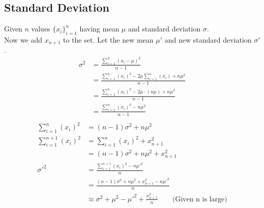 \documentclass[11pt]{article}
\begin{document}
\subsection*{Standard Deviation}
Given $n$ values $\{x_i\}^n_{i=1}$ having mean $\mu$ and standard deviation $\sigma$. \\
Now we add $x_{n+1}$ to the set. Let the new mean $\mu'$ and new standard deviation $\sigma'$. \\
\begin{equation*}
    \begin{split}
        \sigma^2 &= \frac{\sum_{i=1}^{n} (x_i - \mu)^2}{n-1} \\
            &= \frac{\sum_{i=1}^{n} (x_i)^2 - 2\mu\sum_{i=1}^{n} (x_i) + n\mu^2 }{n-1} \\
            &= \frac{\sum_{i=1}^{n} (x_i)^2 - 2\mu\cdot(n\mu) + n{\mu}^2}{n-1} \\
            &= \frac{\sum_{i=1}^{n} (x_i)^2 - n{\mu}^2}{n-1} \\
    \end{split}
\end{equation*}
\begin{equation*}
    \begin{split}
        \sum_{i=1}^{n} (x_i)^2 &= (n-1)\sigma^2 + n{\mu}^2 \\
        \sum_{i=1}^{n+1} (x_i)^2 &= \sum_{i=1}^{n} (x_i)^2 + x_{n+1}^2 \\
            &= (n-1)\sigma^2 + n{\mu}^2 + x_{n+1}^2 \\
        \sigma'^2 &= \frac{\sum_{i=1}^{n+1} (x_i)^2 - n{\mu'}^2}{n} \\
            &= \frac{(n-1)\sigma^2 + n{\mu}^2 + x_{n+1}^2 - n{\mu'}^2}{n} \\
            &\approx \sigma^2 + \mu^2 - \mu'^2 + \frac{x_{n+1}^2}{n} \hspace{2em} \text{(Given n is large)} \\
    \end{split}
\end{equation*}
\end{document}

